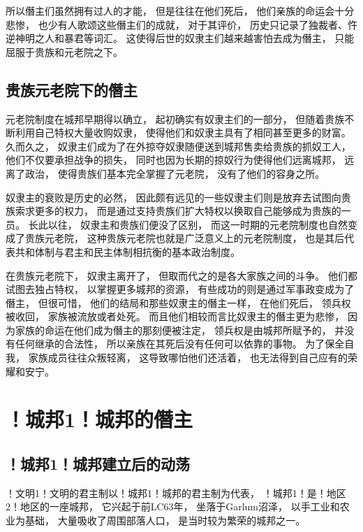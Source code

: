 \documentclass[12pt, a4paper]{ctexart}
\begin{document}
        所以僭主们虽然拥有过人的才能，
        但是往往在他们死后，
        他们亲族的命运会十分悲惨，
        也少有人歌颂这些僭主们的成就，
        对于其评价，
        历史只记录了独裁者、忤逆神明之人和暴君等词汇。
        这使得后世的奴隶主们越来越害怕去成为僭主，
        只能屈服于贵族和元老院之下。
    \subsection{贵族元老院下的僭主}
        元老院制度在城邦早期得以确立，
        起初确实有奴隶主们的一部分，
        但随着贵族不断利用自己特权大量收购奴隶，
        使得他们和奴隶主具有了相同甚至更多的财富。
        久而久之，
        奴隶主们成为了在外掠夺奴隶随便送到城邦售卖给贵族的抓奴工人，
        他们不仅要承担战争的损失，
        同时也因为长期的掠奴行为使得他们远离城邦，
        远离了政治，
        使得贵族们基本完全掌握了元老院，
        没有了他们的容身之所。

        奴隶主的衰败是历史的必然，
        因此颇有远见的一些奴隶主们则是放弃去试图向贵族索求更多的权力，
        而是通过支持贵族们扩大特权以换取自己能够成为贵族的一员。
        长此以往，
        奴隶主和贵族们便没了区别，
        而这一时期的元老院制度也自然变成了贵族元老院，
        这种贵族元老院也就是广泛意义上的元老院制度，
        也是其后代表共和体制与君主和民主体制相抗衡的基本政治制度。

        在贵族元老院下，
        奴隶主离开了，
        但取而代之的是各大家族之间的斗争。
        他们都试图去独占特权，
        以掌握更多城邦的资源，
        有些成功的则是通过军事政变成为了僭主，
        但很可惜，
        他们的结局和那些奴隶主的僭主一样，
        在他们死后，
        领兵权被收回，
        家族被流放或者处死。
        而且他们相较而言比奴隶主的僭主更为悲惨，
        因为家族的命运在他们成为僭主的那刻便被注定，
        领兵权是由城邦所赋予的，
        并没有任何继承的合法性，
        所以亲族在其死后没有任何可以依靠的事物。
        为了保全自我，
        家族成员往往众叛轻离，
        这导致哪怕他们还活着，
        也无法得到自己应有的荣耀和安宁。
\section{！城邦1！城邦的僭主}
    \subsection{！城邦1！城邦建立后的动荡}
        ！文明1！文明的君主制以！城邦1！城邦的君主制为代表，
        ！城邦1！是！地区2！地区的一座城邦，
        它兴起于前LC63年，
        坐落于Garlum沼泽，
        以手工业和农业为基础，
        大量吸收了周围部落人口，
        是当时较为繁荣的城邦之一。
\end{document}
